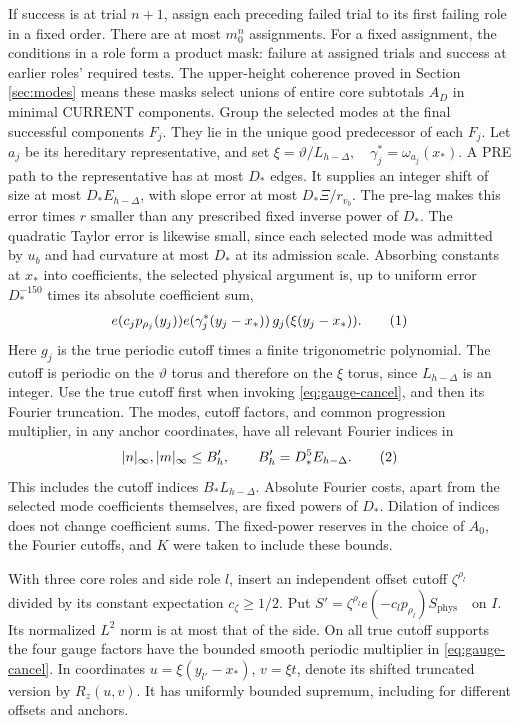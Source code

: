 \documentclass[11pt]{article}
\theoremstyle{definition}
\newcommand{\phys}{\mathrm{phys}}
\newcommand{\eqtag}[1]{\refstepcounter{equation}\tag{\theequation}\label{#1}}
\numberwithin{equation}{section}
\begin{document}
If success is at trial $n+1$, assign each preceding failed trial to its first failing role in a fixed order. There are at most $m_0^n$ assignments. For a fixed assignment, the conditions in a role form a product mask: failure at assigned trials and success at earlier roles' required tests. The upper-height coherence proved in Section \ref{sec:modes} means these masks select unions of entire core subtotals $A_D$ in minimal CURRENT components. Group the selected modes at the final successful components $F_j$. They lie in the unique good predecessor of each $F_j$. Let $a_j$ be its hereditary representative, and set $\xi=\vartheta/L_{h-\Delta},\quad \gamma_j^*=\omega_{a_j}(x_*)$. A PRE path to the representative has at most $D_*$ edges. It supplies an integer shift of size at most $D_*E_{h-\Delta}$, with slope error at most $D_*\Xi/r_{v_b}$. The pre-lag makes this error times $r$ smaller than any prescribed fixed inverse power of $D_*$. The quadratic Taylor error is likewise small, since each selected mode was admitted by $u_b$ and had curvature at most $D_*$ at its admission scale. Absorbing constants at $x_*$ into coefficients, the selected physical argument is, up to uniform error $D_*^{-150}$ times its absolute coefficient sum,
\[
 e(c_jp_{\rho_j}(y_j))e(\gamma_j^*(y_j-x_*))\,g_j(\xi(y_j-x_*)).
 \eqtag{eq:core-torus-form}
\]
Here $g_j$ is the true periodic cutoff times a finite trigonometric polynomial. The cutoff is periodic on the $\vartheta$ torus and therefore on the $\xi$ torus, since $L_{h-\Delta}$ is an integer. Use the true cutoff first when invoking \eqref{eq:gauge-cancel}, and then its Fourier truncation. The modes, cutoff factors, and common progression multiplier, in any anchor coordinates, have all relevant Fourier indices in
\[
 |n|_\infty,|m|_\infty\le B_h',\qquad B_h'=D_*^5E_{h-\Delta}.
 \eqtag{eq:frequency-box}
\]
This includes the cutoff indices $B_*L_{h-\Delta}$. Absolute Fourier costs, apart from the selected mode coefficients themselves, are fixed powers of $D_*$. Dilation of indices does not change coefficient sums. The fixed-power reserves in the choice of $A_0$, the Fourier cutoffs, and $K$ were taken to include these bounds.

With three core roles and side role $l$, insert an independent offset cutoff $\zeta^{\rho_l}$ divided by its constant expectation $c_\zeta\ge1/2$. Put $S'=\zeta^{\rho_l}e(-c_lp_{\rho_l})S_{\phys}\quad\text{on }I$. Its normalized $L^2$ norm is at most that of the side. On all true cutoff supports the four gauge factors have the bounded smooth periodic multiplier in \eqref{eq:gauge-cancel}. In coordinates $u=\xi(y_{l'}-x_*)$, $v=\xi t$, denote its shifted truncated version by $R_z(u,v)$. It has uniformly bounded supremum, including for different offsets and anchors.
\end{document}
